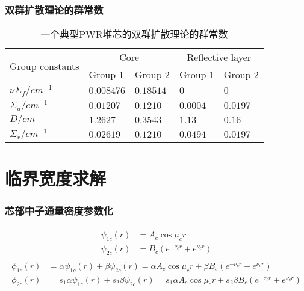 \documentclass[handout,10pt]{beamer}
\begin{document}
\begin{frame}
\frametitle{双群扩散理论的群常数}
\begin{table}[H]
    \centering
    \caption{一个典型PWR堆芯的双群扩散理论的群常数}
    \label{tab:constants}
    \begin{tabular}{lllll}
    \toprule
    \multirow{2}{*}{Group constants} & \multicolumn{2}{c}{Core} & \multicolumn{2}{c}{Reflective layer} \\
    \cmidrule(lr){2-3}\cmidrule(lr){4-5}
     & Group 1 & Group 2 & Group 1 & Group 2 \\
    \midrule
    $\nu\Sigma_f/\si{cm^{-1}}$ & $0.008476$ & $0.18514$ & $0$ & $0$ \\
    $\Sigma_a/\si{cm^{-1}}$ & $0.01207$ & $0.1210$ & $0.0004$ & $0.0197$ \\
    $D/\si{cm}$ & $1.2627$ & $0.3543$ & $1.13$ & $0.16$ \\
    $\Sigma_r/\si{cm^{-1}}$ & $0.02619$ & $0.1210$ & $0.0494$ & $0.0197$ \\
    \bottomrule
    \end{tabular}
\end{table}
\end{frame}

\section{临界宽度求解}

\begin{frame}
\frametitle{芯部中子通量密度参数化}
\begin{align*}
    \begin{split}
        \psi_{1c}(r) &= A_c\cos{\mu_c r} \\
        \psi_{2c}(r) &= B_c\left(e^{-\nu_c r} + e^{\nu_c r}\right)
    \end{split}
\end{align*}
\begin{align*}
    \begin{split}
        \phi_{1c}(r) &= \alpha\psi_{1c}(r) + \beta\psi_{2c}(r) = \alpha A_c\cos{\mu_c r} + \beta B_c\left(e^{-\nu_c r} + e^{\nu_c r}\right) \\
        \phi_{2c}(r) &= s_1\alpha\psi_{1c}(r) + s_2\beta\psi_{2c}(r) = s_1\alpha A_c\cos{\mu_c r} + s_2\beta B_c\left(e^{-\nu_c r} + e^{\nu_c r}\right)
    \end{split}
\end{align*}
\end{frame}
\end{document}
